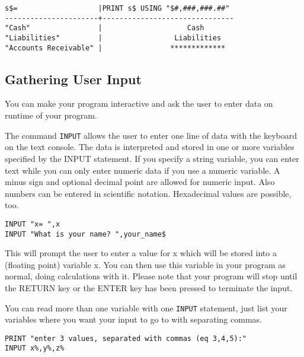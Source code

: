\begin{verbatim}
s$=                   |PRINT s$ USING "$#,###,###.##"
----------------------+-------------------------------
"Cash"                |                    Cash
"Liabilities"         |                 Liabilities
"Accounts Receivable" |                *************
\end{verbatim}

\subsection{Gathering User Input}

You can make your program interactive and ask the user to enter data on runtime
of your program.

The command \verb|INPUT| allows the user to enter one line of data with the 
keyboard on the text console. The data is interpreted and stored in one or more
variables specified by the INPUT statement. If you specify a string variable,
you can enter text while you can only enter numeric data if you use a numeric
variable. A minus sign and optional decimal point are allowed for numeric input.
Also numbers can be entered in scientific notation. Hexadecimal values are
possible, too.

\begin{mdframed}[hidealllines=true,backgroundcolor=blue!20]
\begin{verbatim}
INPUT "x= ",x
INPUT "What is your name? ",your_name$
\end{verbatim}
\end{mdframed}

This will prompt the user to enter a value for x which will be stored into a
(floating point) variable x. You can then use this variable in your program as
normal, doing calculations with it. Please note that your program will stop 
until the RETURN key or the ENTER key has been pressed to terminate the input.

You can read more than one variable with one \verb|INPUT| statement, just list
your variables where you want your input to go to with separating commas.

\begin{mdframed}[hidealllines=true,backgroundcolor=blue!20]
\begin{verbatim}
PRINT "enter 3 values, separated with commas (eq 3,4,5):"
INPUT x%,y%,z%
\end{verbatim}
\end{mdframed}

